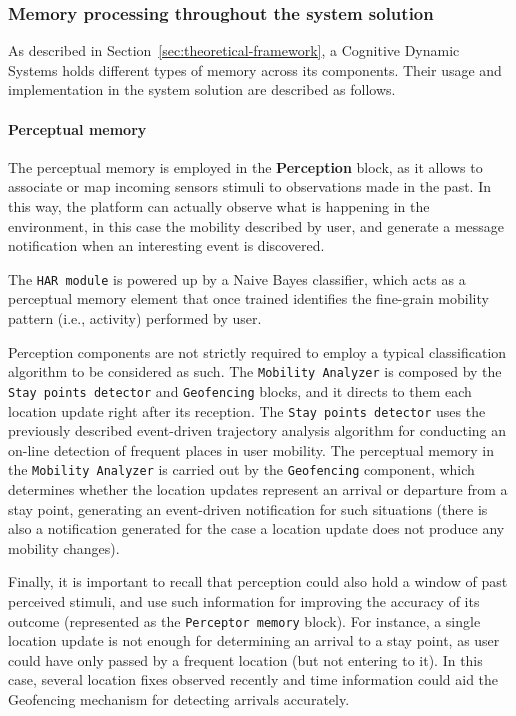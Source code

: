 \documentclass[ENG,PhD]{cinvestav}
\begin{document}
\subsubsection{Memory processing throughout the system solution}
As described in Section~\ref{sec:theoretical-framework}, a Cognitive Dynamic Systems holds different types of memory across its components.
Their usage and implementation in the system solution are described as follows.

\paragraph*{Perceptual memory} 
The perceptual memory is employed in the \textbf{Perception} block, as it allows to associate or map incoming sensors stimuli to observations made in the past.
In this way, the platform can actually observe what is happening in the environment, in this case the mobility described by user, and generate a message notification when an interesting event is discovered.

The \texttt{HAR module} is powered up by a Naive Bayes classifier, which acts as a perceptual memory element that once trained identifies the fine-grain mobility pattern (i.e., activity) performed by user.

Perception components are not strictly required to employ a typical classification algorithm to be considered as such.
The \texttt{Mobility Analyzer} is composed by the \texttt{Stay points detector} and \texttt{Geofencing} blocks, and it directs to them each location update right after its reception.
The \texttt{Stay points detector} uses the previously described event-driven trajectory analysis algorithm for conducting an on-line detection of frequent places in user mobility.
The perceptual memory in the \texttt{Mobility Analyzer} is carried out by the \texttt{Geofencing} component, which determines whether the location updates represent an arrival or departure from a stay point, generating an event-driven notification for such situations (there is also a notification generated for the case a location update does not produce any mobility changes).

Finally, it is important to recall that perception could also hold a window of past perceived stimuli, and use such information for improving the accuracy of its outcome (represented as the \texttt{Perceptor memory} block).
For instance, a single location update is not enough for determining an arrival to a stay point, as user could have only passed by a frequent location (but not entering to it).
In this case, several location fixes observed recently and time information could aid the Geofencing mechanism for detecting arrivals accurately.
\end{document}
